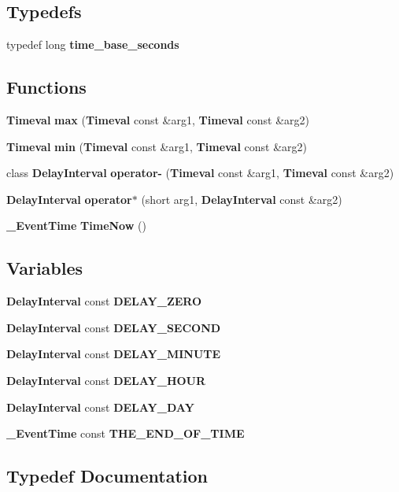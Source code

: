 \subsection*{Typedefs}
\begin{DoxyCompactItemize}
\item 
typedef long {\bf time\+\_\+base\+\_\+seconds}
\end{DoxyCompactItemize}
\subsection*{Functions}
\begin{DoxyCompactItemize}
\item 
{\bf Timeval} {\bf max} ({\bf Timeval} const \&arg1, {\bf Timeval} const \&arg2)
\item 
{\bf Timeval} {\bf min} ({\bf Timeval} const \&arg1, {\bf Timeval} const \&arg2)
\item 
class {\bf Delay\+Interval} {\bf operator-\/} ({\bf Timeval} const \&arg1, {\bf Timeval} const \&arg2)
\item 
{\bf Delay\+Interval} {\bf operator$\ast$} (short arg1, {\bf Delay\+Interval} const \&arg2)
\item 
{\bf \+\_\+\+Event\+Time} {\bf Time\+Now} ()
\end{DoxyCompactItemize}
\subsection*{Variables}
\begin{DoxyCompactItemize}
\item 
{\bf Delay\+Interval} const {\bf D\+E\+L\+A\+Y\+\_\+\+Z\+E\+R\+O}
\item 
{\bf Delay\+Interval} const {\bf D\+E\+L\+A\+Y\+\_\+\+S\+E\+C\+O\+N\+D}
\item 
{\bf Delay\+Interval} const {\bf D\+E\+L\+A\+Y\+\_\+\+M\+I\+N\+U\+T\+E}
\item 
{\bf Delay\+Interval} const {\bf D\+E\+L\+A\+Y\+\_\+\+H\+O\+U\+R}
\item 
{\bf Delay\+Interval} const {\bf D\+E\+L\+A\+Y\+\_\+\+D\+A\+Y}
\item 
{\bf \+\_\+\+Event\+Time} const {\bf T\+H\+E\+\_\+\+E\+N\+D\+\_\+\+O\+F\+\_\+\+T\+I\+M\+E}
\end{DoxyCompactItemize}


\subsection{Typedef Documentation}
